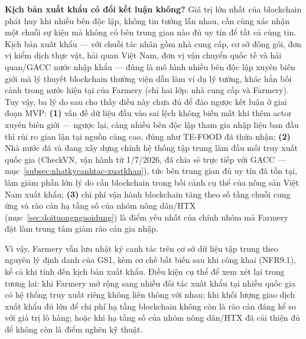 \noindent\textbf{Kịch bản xuất khẩu có đổi kết luận không?} Giá trị lớn nhất của blockchain phát huy khi nhiều bên độc lập, không tin tưởng lẫn nhau, cần cùng xác nhận một chuỗi sự kiện mà không có bên trung gian nào đủ uy tín để tất cả cùng tin. Kịch bản xuất khẩu --- với chuỗi tác nhân gồm nhà cung cấp, cơ sở đóng gói, đơn vị kiểm dịch thực vật, hải quan Việt Nam, đơn vị vận chuyển quốc tế và hải quan/GACC nước nhập khẩu --- đúng là mô hình nhiều bên độc lập xuyên biên giới mà lý thuyết blockchain thường viện dẫn làm ví dụ lý tưởng, khác hẳn bối cảnh trong nước hiện tại của Farmery (chỉ hai lớp: nhà cung cấp và Farmery). Tuy vậy, ba lý do sau cho thấy điều này chưa đủ để đảo ngược kết luận ở giai đoạn MVP: \textbf{(1)} vấn đề dữ liệu đầu vào sai lệch không biến mất khi thêm actor xuyên biên giới --- ngược lại, càng nhiều bên độc lập tham gia nhập liệu ban đầu thì rủi ro gian lận tại nguồn càng cao, đúng như TE-FOOD đã thừa nhận; \textbf{(2)} Nhà nước đã và đang xây dựng chính hệ thống tập trung làm đầu mối truy xuất quốc gia (CheckVN, vận hành từ 1/7/2026, đã chia sẻ trực tiếp với GACC --- mục~\ref{subsec:nhatkycanhtac-xuatkhau}), tức bên trung gian đủ uy tín đã tồn tại, làm giảm phần lớn lý do cần blockchain trong bối cảnh cụ thể của nông sản Việt Nam xuất khẩu; \textbf{(3)} chi phí vận hành blockchain tăng theo số tầng chuỗi cung ứng \parencite{longo2020blockchain_dairy} và rào cản hạ tầng số của nhóm nông dân/HTX (mục~\ref{sec:doituongnguoidung}) là điểm yếu nhất của chính nhóm mà Farmery đặt làm trung tâm giảm rào cản gia nhập.

Vì vậy, Farmery vẫn lưu nhật ký canh tác trên cơ sở dữ liệu tập trung theo nguyên lý định danh của GS1, kèm cơ chế bất biến sau khi công khai (NFR9.1), kể cả khi tính đến kịch bản xuất khẩu. Điều kiện cụ thể để xem xét lại trong tương lai: khi Farmery mở rộng sang nhiều đối tác xuất khẩu tại nhiều quốc gia có hệ thống truy xuất riêng không liên thông với nhau; khi khối lượng giao dịch xuất khẩu đủ lớn để chi phí hạ tầng blockchain không còn là rào cản đáng kể so với giá trị lô hàng; hoặc khi hạ tầng số của nhóm nông dân/HTX đã cải thiện đủ để không còn là điểm nghẽn kỹ thuật.

